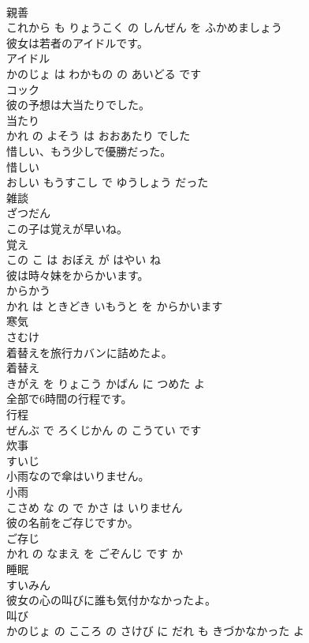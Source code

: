 \documentclass[8pt]{extreport}
\begin{document}
\begin{CJK}{UTF8}{min}
\\	親善 
\\	これから も りょうこく の しんぜん を ふかめましょう			
\\	彼女は若者のアイドルです。	
\\	アイドル 
\\	かのじょ は わかもの の あいどる です			
\\	コック	
\\	彼の予想は大当たりでした。	
\\	当たり 
\\	かれ の よそう は おおあたり でした			
\\	惜しい、もう少しで優勝だった。	
\\	惜しい 
\\	おしい もうすこし で ゆうしょう だった			
\\	雑談	
\\	ざつだん			
\\	この子は覚えが早いね。	
\\	覚え 
\\	この こ は おぼえ が はやい ね			
\\	彼は時々妹をからかいます。	
\\	からかう 
\\	かれ は ときどき いもうと を からかいます			
\\	寒気	
\\	さむけ			
\\	着替えを旅行カバンに詰めたよ。	
\\	着替え 
\\	きがえ を りょこう かばん に つめた よ			
\\	全部で6時間の行程です。	
\\	行程 
\\	ぜんぶ で ろくじかん の こうてい です			
\\	炊事	
\\	すいじ			
\\	小雨なので傘はいりません。	
\\	小雨 
\\	こさめ な の で かさ は いりません			
\\	彼の名前をご存じですか。	
\\	ご存じ 
\\	かれ の なまえ を ごぞんじ です か			
\\	睡眠	
\\	すいみん			
\\	彼女の心の叫びに誰も気付かなかったよ。	
\\	叫び 
\\	かのじょ の こころ の さけび に だれ も きづかなかった よ			

\end{CJK}
\end{document}
